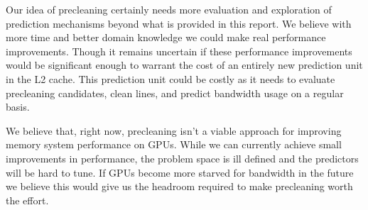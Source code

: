 Our idea of precleaning certainly needs more evaluation and exploration of prediction mechanisms beyond what is provided in this report. We believe with more time and better domain knowledge we could make real performance improvements. Though it remains uncertain if these performance improvements would be significant enough to warrant the cost of an entirely new prediction unit in the L2 cache. This prediction unit could be costly as it needs to evaluate precleaning candidates, clean lines, and predict bandwidth usage on a regular basis.

We believe that, right now, precleaning isn't a viable approach for improving memory system performance on GPUs. While we can currently achieve small improvements in performance, the problem space is ill defined and the predictors will be hard to tune. If GPUs become more starved for bandwidth in the future we believe this would give us the headroom required to make precleaning worth the effort.
